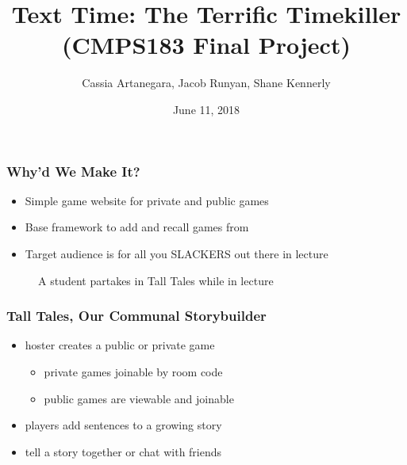 \documentclass[t]{beamer}
\title{Text Time: The Terrific Timekiller \\ (CMPS183 Final Project)}
\author{Cassia Artanegara, Jacob Runyan, Shane Kennerly}
\institute{Jack Baskin School of Engineering \\ University of California, Santa Cruz}
\date{June 11, 2018}
\newcommand{\nologo}{\setbeamertemplate{logo}{}} %
\begin{document}
    
    {
    \nologo
    \begin{frame}
    \maketitle
    \end{frame}
    }

    \begin{frame}
        \frametitle{Why'd We Make It?}
        \begin{itemize}
          \item Simple game website for private and public games
          \item Base framework to add and recall games from
          \item Target audience is for all you SLACKERS out there in lecture
        \end{itemize}
        \begin{figure}
            \begin{center}
            \end{center}
            \caption{A student partakes in Tall Tales while in lecture}
        \end{figure}
    \end{frame}

    \begin{frame}
        \frametitle{Tall Tales, Our Communal Storybuilder}
        \begin{itemize}
          \item hoster creates a public or private game
          \begin{itemize}
            \item private games joinable by room code
            \item public games are viewable and joinable
          \end{itemize}
          \item players add sentences to a growing story 
          \item tell a story together or chat with friends
        \end{itemize}
    \end{frame}
\end{document}
